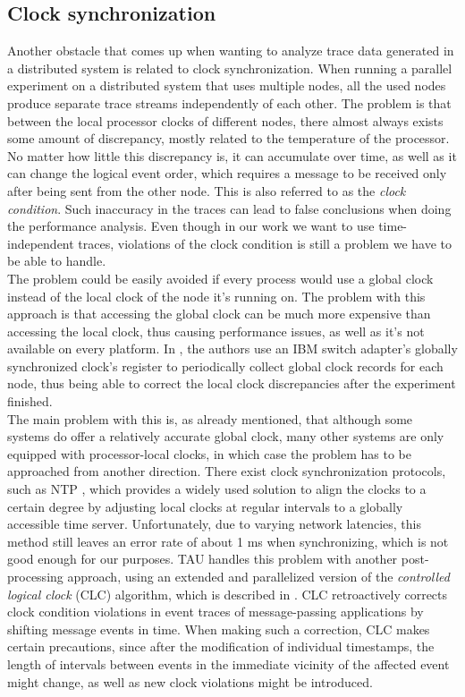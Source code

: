 \subsection{Clock synchronization}
Another obstacle that comes up when wanting to analyze trace data
generated in a distributed system is related to clock
synchronization. When running a parallel experiment on a distributed
system that uses multiple nodes, all the used nodes produce separate
trace streams independently of each other. The problem is that between
the local processor clocks of different nodes, there almost always exists
some amount of discrepancy, mostly related to the temperature
of the processor. No matter how little this discrepancy is,
it can accumulate over time, as well as it can change the logical
event order, which requires a message to be received only after being
sent from the other node. This is also referred to as the \emph{clock
condition}.\cite{wbswpclg00}\cite{brwl09} Such inaccuracy in the traces
can lead to false conclusions when doing the performance
analysis. Even though in our work we want to use time-independent
traces, violations of the clock condition is still a problem we have
to be able to handle.\\
The problem could be easily avoided if every process would use a
global clock instead of the local clock of the node it's running
on. The problem with this approach is that accessing the global clock
can be much more expensive than accessing the local clock, thus
causing performance issues, as well as it's not available on every
platform. In \cite{wbswpclg00}, the authors use an IBM switch
adapter's globally synchronized clock's register to periodically
collect global clock records for each node, thus being able to correct
the local clock discrepancies after the experiment finished.\\
The main problem with this is, as already mentioned, that although
some systems do offer a relatively
accurate global clock, many other systems are only equipped with
processor-local clocks, in which case the problem has to be approached
from another direction. There exist clock synchronization protocols,
such as NTP \cite{m92}, which provides a widely used solution to align
the clocks to a certain degree by adjusting local clocks at regular
intervals to a globally accessible time server. Unfortunately, due to
varying network latencies, this method still leaves an error rate
of about 1 ms when synchronizing, which is not good enough for our
purposes.
TAU handles this problem with another post-processing approach, using
an extended and parallelized version of the \emph{controlled logical
clock} (CLC) algorithm, which is described in \cite{brwl09}. CLC
retroactively corrects clock condition violations in event traces of
message-passing applications by shifting message events in time. When
making such a correction, CLC makes certain precautions, since
after the modification of individual timestamps, the length of
intervals between events in the immediate vicinity of the affected
event might change, as well as new clock violations might be
introduced.
